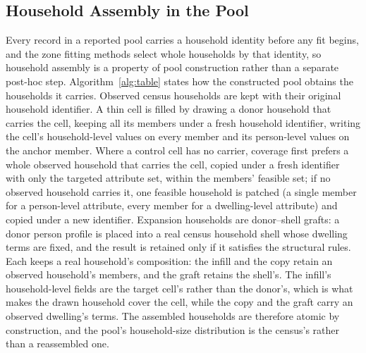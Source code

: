 \documentclass[review]{elsarticle}
\begin{document}
\subsection{Household Assembly in the Pool}
\label{sec:household_appendix}
Every record in a reported pool carries a household identity before any fit
begins, and the zone fitting methods select whole households by that identity, so
household assembly is a property of pool construction rather than a separate
post-hoc step. Algorithm~\ref{alg:table} states how the constructed pool
obtains the households it carries. Observed census households are kept with their
original household identifier. A thin cell is filled by drawing a donor household that
carries the cell, keeping all its members under a fresh household identifier, writing
the cell's household-level values on every member and its person-level values on
the anchor member. Where a control cell has no carrier, coverage first
prefers a whole observed household that carries the cell, copied under a fresh
identifier with only the targeted attribute set, within the members' feasible
set; if no observed household carries it, one feasible household is patched (a
single member for a person-level attribute, every member for a dwelling-level
attribute) and copied under a new identifier. Expansion households are
donor--shell grafts: a donor person profile is placed into a real census
household shell whose dwelling terms are fixed, and the result is retained only
if it satisfies the structural rules. Each keeps a real household's composition: the infill and the copy retain an
observed household's members, and the graft retains the shell's. The infill's
household-level fields are the target cell's rather than the donor's, which is
what makes the drawn household cover the cell, while the copy and the graft
carry an observed dwelling's terms. The assembled households are therefore
atomic by construction, and the pool's household-size distribution is the
census's rather than a reassembled one.
\end{document}
